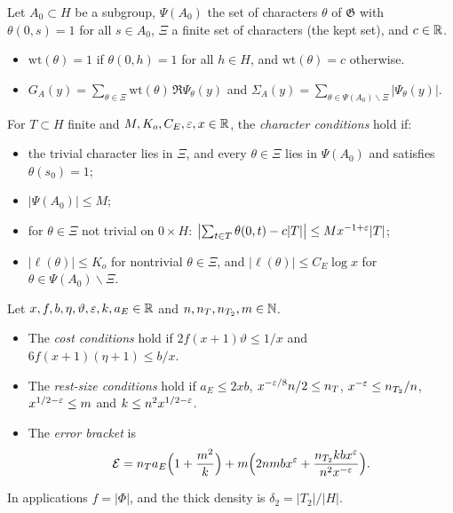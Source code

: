 \begin{definition}\label{bal:kept-chars}
Let $A_0\subset H$ be a subgroup, $\Psi(A_0)$ the set of characters $\theta$ of $\mathfrak G$ with $\theta(0,s)=1$ for all $s\in A_0$, $\Xi$ a finite set of characters (the kept set), and $c\in\mathbb{R}$.
\begin{itemize}
\item $\mathrm{wt}(\theta)=1$ if $\theta(0,h)=1$ for all $h\in H$, and $\mathrm{wt}(\theta)=c$ otherwise.
\item $G_A(y)=\sum_{\theta\in\Xi}\mathrm{wt}(\theta)\,\Re\Psi_{\theta}(y)$ and $\Sigma_A(y)=\sum_{\theta\in\Psi(A_0)\smallsetminus\Xi}|\Psi_{\theta}(y)|$.
\end{itemize}
For $T\subset H$ finite and $M,K_o,C_E,\varepsilon,x\in\mathbb{R}$, the \emph{character conditions} hold if:
\begin{itemize}
\item the trivial character lies in $\Xi$, and every $\theta\in\Xi$ lies in $\Psi(A_0)$ and satisfies $\theta(s_0)=1$;
\item $|\Psi(A_0)|\le M$;
\item for $\theta\in\Xi$ not trivial on $0\times H$: $\bigl|\sum_{t\in T}\theta(0,t)-c|T|\bigr|\le Mx^{-1+\varepsilon}|T|$;
\item $|\ell(\theta)|\le K_o$ for nontrivial $\theta\in\Xi$, and $|\ell(\theta)|\le C_E\log x$ for $\theta\in\Psi(A_0)\smallsetminus\Xi$.
\end{itemize}
\end{definition}

\begin{definition}\label{bal:rest-size}
Let $x,f,b,\eta,\vartheta,\varepsilon,k,a_E\in\mathbb{R}$ and $n,n_T,n_{T_2},m\in\mathbb{N}$.
\begin{itemize}
\item The \emph{cost conditions} hold if $2f(x+1)\vartheta\le1/x$ and $6f(x+1)(\eta+1)\le b/x$.
\item The \emph{rest-size conditions} hold if $a_E\le2xb$, $x^{-\varepsilon/8}n/2\le n_T$, $x^{-\varepsilon}\le n_{T_2}/n$, $x^{1/2-\varepsilon}\le m$ and $k\le n^2x^{1/2-\varepsilon}$.
\item The \emph{error bracket} is
\[\mathcal E=n_Ta_E\Bigl(1+\frac{m^2}k\Bigr)+m\Bigl(2nmbx^{\varepsilon}+\frac{n_{T_2}kbx^{\varepsilon}}{n^2x^{-\varepsilon}}\Bigr).\]
\end{itemize}
In applications $f=|\Phi|$, and the thick density is $\delta_2=|T_2|/|H|$.
\end{definition}


